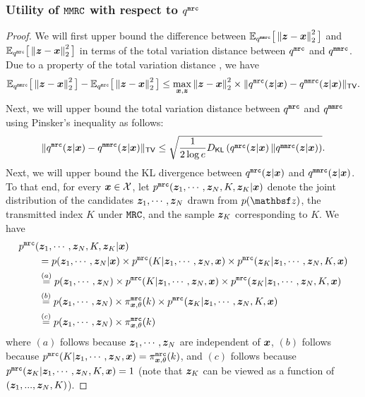 \subsubsection{Utility of \texorpdfstring{$\MMRC$}{MMRC} with respect to \texorpdfstring{$\qMRC$}{}}\label{appendix:utility_mmrc_mrc}
\mmrcaccuracylocalwrtmrc*
\begin{proof}
We will first upper bound the difference between $\Expectation_{\qMMRC} \big[ \lV  \svbz - \svbx \rV^2_2  \big]$ and $\Expectation_{\qMRC} \big[ \lV  \svbz - \svbx \rV^2_2  \big]$ in terms of the total variation distance between $\qMRC$ and $\qMMRC$. Due to a property of the total variation distance \citep[e.g.,][]{SCV16}, we have
\begin{align}
  \Expectation_{\qMMRC} \big[ \lV  \svbz - \svbx \rV^2_2  \big]   - \Expectation_{\qMRC}\big[ \lV  \svbz - \svbx \rV^2_2  \big] \leq \max_{\svbx, \svbz} \lV  \svbz- \svbx \rV^2_2  \times   \TV{\qMRC(\svbz | \svbx)}{\qMMRC(\svbz | \svbx)}. \label{eq:mmrc_generic_1}
\end{align}
Next, we will upper bound the total variation distance between $\qMRC$ and $\qMMRC$ using Pinsker's inequality as follows:
\begin{align}
  \TV{\qMRC(\svbz | \svbx)}{\qMMRC(\svbz | \svbx)} \leq \sqrt{\frac{1}{2 \log e} \KLD{\qMRC(\svbz | \svbx)}{\qMMRC(\svbz | \svbx)}}. \label{eq:mmrc_generic_2}
\end{align}
Next, we will upper bound the KL divergence between $\qMRC(\svbz | \svbx)$ and $\qMMRC(\svbz | \svbx)$. To that end, for every $\svbx \in \cX$, let $\pMRC(\svbz_1, \cdots, \svbz_N, K, \svbz_K | \svbx)$ denote the joint distribution of the candidates $\svbz_1, \cdots, \svbz_N$ drawn from $p(\rvbz)$,  the transmitted index $K$ under $\MRC$, and the sample $\svbz_K$ corresponding to $K$. We have
\begin{align}
& \pMRC(\svbz_1, \cdots, \svbz_N, K, \svbz_K | \svbx)\\
& \qquad =  p(\svbz_1, \cdots, \svbz_N | \svbx)  \times \pMRC(K | \svbz_1, \cdots, \svbz_N, \svbx) \times \pMRC(\svbz_K | \svbz_1, \cdots, \svbz_N, K, \svbx)\\
& \qquad \stackrel{(a)}{=} p(\svbz_1, \cdots, \svbz_N) \times \pMRC(K | \svbz_1, \cdots, \svbz_N, \svbx) \times \pMRC(\svbz_K | \svbz_1, \cdots, \svbz_N, K, \svbx)\\
& \qquad \stackrel{(b)}{=} p(\svbz_1, \cdots, \svbz_N) \times \piMRC_{\svbx, \theta}(k) \times \pMRC(\svbz_K | \svbz_1, \cdots, \svbz_N, K, \svbx)\\
& \qquad \stackrel{(c)}{=} p(\svbz_1, \cdots, \svbz_N) \times \piMRC_{\svbx, \theta}(k) \label{eq:mmrc_generic_3}
\end{align}
where $(a)$ follows because $\svbz_1, \cdots, \svbz_N$ are independent of $\svbx$, $(b)$ follows because $\pMRC(K | \svbz_1, \cdots, \svbz_N, \svbx) = \piMRC_{\svbx, \theta}(k)$, and $(c)$ follows because $\pMRC(\svbz_K | \svbz_1, \cdots, \svbz_N, K, \svbx) = 1$ (note that $\svbz_K$ can be viewed as a function of $(\svbz_1,...,\svbz_N, K)$). 


\end{proof}

